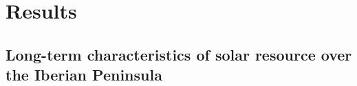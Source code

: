 \part{Results}

\chapter{Long-term characteristics of solar resource over the Iberian Peninsula}

\begin{abstract}




\end{abstract}
